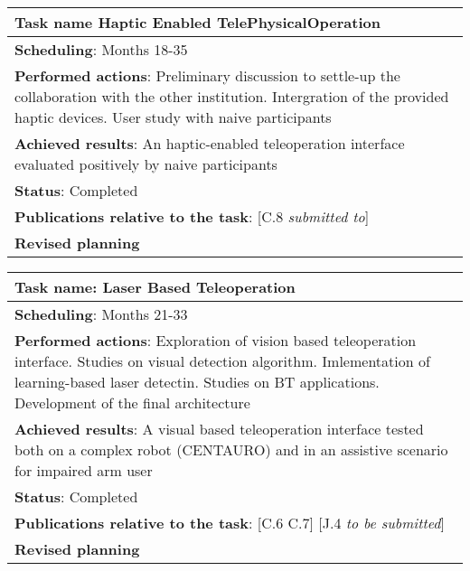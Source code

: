 \begin{table}[H]
	\begin{center}
		\renewcommand{\arraystretch}{1.3} %
		\setlength{\tabcolsep}{8pt} %
		\begin{tabular}{|P{15cm}|}
			\hline
			\textbf{Task name} Haptic Enabled TelePhysicalOperation \\ \hline
			\textbf{Scheduling}: Months 18-35 \\ \hline
			\textbf{Performed actions}: Preliminary discussion to settle-up the collaboration with the other institution. Intergration of the provided haptic devices. User study with naive participants\\
			\hline
			\textbf{Achieved results}: An haptic-enabled teleoperation interface evaluated positively by naive participants \\
			\hline
			\textbf{Status}: Completed\\
			\hline
			\textbf{Publications relative to the task}: [C.8 \textit{submitted to}]\\
			\hline
			\textbf{Revised planning}\\
			\hline
		\end{tabular}
	\end{center}
\end{table}

\begin{table}[H]
	\begin{center}
		\renewcommand{\arraystretch}{1.3} %
		\setlength{\tabcolsep}{8pt} %
		\begin{tabular}{|P{15cm}|}
			\hline
			\textbf{Task name}: Laser Based Teleoperation \\ \hline
			\textbf{Scheduling}: Months 21-33 \\ \hline
			\textbf{Performed actions}: Exploration of vision based teleoperation interface. Studies on visual detection algorithm. Imlementation of learning-based laser detectin. Studies on BT applications. Development of the final architecture\\
			\hline
			\textbf{Achieved results}: A visual based teleoperation interface tested both on a complex robot (CENTAURO) and in an assistive scenario for impaired arm user\\
			\hline
			\textbf{Status}: Completed\\
			\hline
			\textbf{Publications relative to the task}: [C.6 C.7] [J.4 \textit{to be submitted}]\\
			\hline
			\textbf{Revised planning}\\
			\hline
		\end{tabular}
	\end{center}
\end{table}
